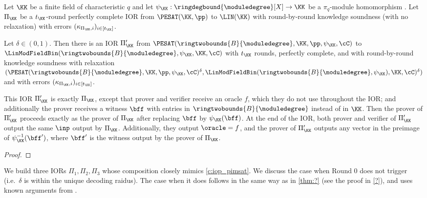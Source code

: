 \begin{lemma}\label{l:lift_pesat_to_encodings}
Let $\KK$ be a finite field of characteristic $q$ and let $\psi_\KK:\ringdegbound{\moduledegree}[X]\to \KK$ be a $\pi_q$-module homomorphism . Let $\Pi_\KK$ be a $t_\KK$-round perfectly complete IOR from $\PESAT(\KK,\pp)$ to $\LIN(\KK)$ with round-by-round knowledge soundness (with no relaxation) with errors $(\kappa_{\Pi_\KK, i})_{i\in [t_\KK]}$. 

Let $\delta\in (0,1)$. Then there is an IOR $\Pi_\KK'$ from $\PESAT(\ringtwobounds{B}{\moduledegree}, \KK,\pp,\psi_\KK, \cC)$ to $\LinModFieldBin(\ringtwobounds{B}{\moduledegree},\psi_\KK, \KK,\cC)$  with $t_\KK$ rounds, perfectly complete, and with round-by-round knowledge soundness with relaxation $(\PESAT(\ringtwobounds{B}{\moduledegree}, \KK,\pp,\psi_\KK, \cC)^\delta,\LinModFieldBin(\ringtwobounds{B}{\moduledegree},\psi_\KK), \KK, \cC)^\delta)$ and with errors $(\kappa_{\Pi_\KK, i})_{i\in [t_\KK]}$.  

 This IOR $\Pi_\KK'$ is exactly $\Pi_\KK$, except that prover and verifier receive an oracle $f$, which they do not use throughout the IOR; and additionally the prover receives a witness $\bff$ with entries in $\ringtwobounds{B}{\moduledegree}$ instead of in $\KK$. Then the prover of $\Pi_\KK'$ proceeds exactly as the prover of $\Pi_\KK$ after replacing $\bff$ by $\psi_\KK(\bff)$. At the end of the IOR, both prover and verifier of $\Pi_\KK'$ output the same  $\inp$ output by $\Pi_\KK$. Additionally, they output $\oracle=f$, and the prover of $\Pi_\KK'$ outputs any vector in the preimage of $\psi_\KK^{-1}(\bff')$, where $\bff'$ is the witness output by the prover of $\Pi_\KK$. 
\end{lemma}
\begin{proof}
\end{proof}

\bigskip

\noindent We build  three IORs $\Pi_1,\Pi_2,\Pi_3$ whose composition closely mimics \cref{c:iop_pimsat}.  We discuss the case when Round 0 does not trigger (i.e.\ $\delta$ is within the unique decoding raidus). The case when it does follows in the same way as in \cref{thm:?} (see the proof in \cref{?}), and uses known arguments from \cite{stir,whir}.




